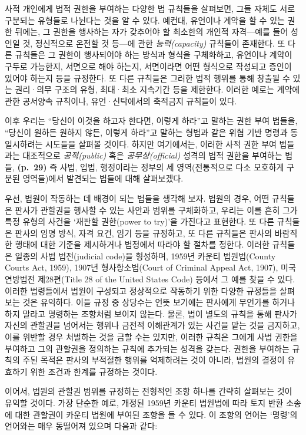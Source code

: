 \documentclass[12pt, oneside]{book}  %
\begin{document}
사적 개인에게 법적 권한을 부여하는 다양한 법 규칙들을 살펴보면, 그들
자체도 서로 구분되는 유형들로 나뉜다는 것을 알 수 있다. 예컨대, 유언이나
계약을 할 수 있는 권한 뒤에는, 그 권한을 행사하는 자가 갖추어야 할
최소한의 개인적 자격---예를 들어 성인일 것, 정신적으로 온전할 것 등---에
관한 \emph{능력(capacity)} 규칙들이 존재한다. 또 다른 규칙들은 그 권한이
행사되어야 하는 방식과 형식을 구체화하고, 유언이나 계약이 구두로
가능한지, 서면으로 해야 하는지, 서면이라면 어떤 형식으로 작성되고 증인이
있어야 하는지 등을 규정한다. 또 다른 규칙들은 그러한 법적 행위를 통해
창출될 수 있는 권리·의무 구조의 유형, 최대·최소 지속기간 등을 제한한다.
이러한 예로는 계약에 관한 공서양속 규칙이나, 유언·신탁에서의 축적금지
규칙들이 있다.

이후 우리는 ``당신이 이것을 하고자 한다면, 이렇게 하라''고 말하는 권한
부여 법들을, ``당신이 원하든 원하지 않든, 이렇게 하라''고 말하는 형법과
같은 위협 기반 명령과 동일시하려는 시도들을 살펴볼 것이다. 하지만
여기에서는, 이러한 사적 권한 부여 법들과는 대조적으로
\emph{공적(public)} 혹은 \emph{공무상(official)} 성격의 법적 권한을
부여하는 법들, \textbf{(p.~29)} 즉 사법, 입법, 행정이라는 정부의 세
영역(전통적으로 다소 모호하게 구분된 영역들)에서 발견되는 법들에 대해
살펴보겠다.

우선, 법원이 작동하는 데 배경이 되는 법들을 생각해 보자. 법원의 경우,
어떤 규칙들은 판사가 관할권을 행사할 수 있는 사안과 범위를 구체화하고,
우리는 이를 흔히 그가 특정 유형의 사건을 `재판할 권한(power to try)'을
가진다고 표현한다. 또 다른 규칙들은 판사의 임명 방식, 자격 요건, 임기
등을 규정하고, 또 다른 규칙들은 판사의 바람직한 행태에 대한 기준을
제시하거나 법정에서 따라야 할 절차를 정한다. 이러한 규칙들은 일종의 사법
법전(judicial code)을 형성하며, 1959년 카운티 법원법(County Courts Act,
1959), 1907년 형사항소법(Court of Criminal Appeal Act, 1907), 미국
연방법전 제28편(Title 28 of the United States Code) 등에서 그 예를 찾을
수 있다. 이러한 법령들에서 법원이 구성되고 정상적으로 작동하기 위한
다양한 규정들을 살펴보는 것은 유익하다. 이들 규정 중 상당수는 언뜻
보기에는 판사에게 무언가를 하거나 하지 말라고 명령하는 조항처럼 보이지
않는다. 물론, 법이 별도의 규칙을 통해 판사가 자신의 관할권을 넘어서는
행위나 금전적 이해관계가 있는 사건을 맡는 것을 금지하고, 이를 위반할
경우 처벌하는 것을 금할 수는 있지만, 이러한 규칙은 그에게 사법 권한을
부여하고 그의 관할권을 정의하는 규칙에 추가되는 성격을 갖는다. 권한을
부여하는 규칙의 주된 목적은 판사의 부적절한 행위를 억제하려는 것이
아니라, 법원의 결정이 유효하기 위한 조건과 한계를 규정하는 것이다.

이어서, 법원의 관할권 범위를 규정하는 전형적인 조항 하나를 간략히
살펴보는 것이 유익할 것이다. 가장 단순한 예로, 개정된 1959년 카운티
법원법에 따라 토지 반환 소송에 대한 관할권이 카운티 법원에 부여된 조항을
들 수 있다. 이 조항의 언어는 `명령'의 언어와는 매우 동떨어져 있으며
다음과 같다:
\end{document}
